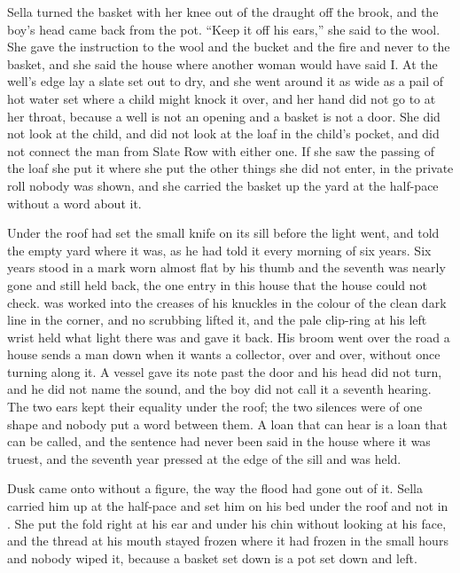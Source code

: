 Sella turned the basket with her knee out of the draught off the brook, and the boy's head came back from the pot. “Keep it off his ears,” she said to the wool. She gave the instruction to the wool and the bucket and the fire and never to the basket, and she said the house where another woman would have said I. At the well's edge lay a slate set out to dry, and she went around it as wide as a pail of hot water set where a child might knock it over, and her hand did not go to  at her throat, because a well is not an opening and a basket is not a door. She did not look at the child, and did not look at the loaf in the child's pocket, and did not connect the man from Slate Row with either one. If she saw the passing of the loaf she put it where she put the other things she did not enter, in the private roll nobody was shown, and she carried the basket up the yard at the half-pace without a word about it.

Under the  roof  had set the small knife on its sill before the light went, and told the empty yard where it was, as he had told it every morning of six years. Six years stood in a mark worn almost flat by his thumb and the seventh was nearly gone and still held back, the one entry in this house that the house could not check.  was worked into the creases of his knuckles in the colour of the clean dark line in the corner, and no scrubbing lifted it, and the pale clip-ring at his left wrist held what light there was and gave it back. His broom went over the road a house sends a man down when it wants a collector, over and over, without once turning along it. A vessel gave its note past the door and his head did not turn, and he did not name the sound, and the boy did not call it a seventh hearing. The two ears kept their equality under the roof; the two silences were of one shape and nobody put a word between them. A loan that can hear is a loan that can be called, and the sentence had never been said in the house where it was truest, and the seventh year pressed at the edge of the sill and was held.

\scenebreak

Dusk came onto  without a figure, the way the flood had gone out of it. Sella carried him up at the half-pace and set him on his bed under the roof and not in . She put the fold right at his ear and under his chin without looking at his face, and the thread at his mouth stayed frozen where it had frozen in the small hours and nobody wiped it, because a basket set down is a pot set down and left.


